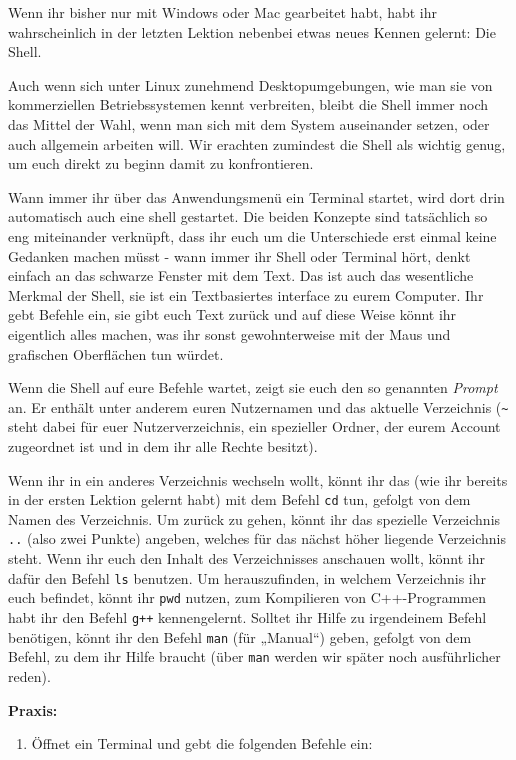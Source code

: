 
Wenn ihr bisher nur mit Windows oder Mac gearbeitet habt, habt ihr
wahrscheinlich in der letzten Lektion nebenbei etwas neues Kennen gelernt: Die
Shell.

Auch wenn sich unter Linux zunehmend Desktopumgebungen, wie man sie von
kommerziellen Betriebssystemen kennt verbreiten, bleibt die Shell immer noch das
Mittel der Wahl, wenn man sich mit dem System auseinander setzen, oder auch
allgemein arbeiten will. Wir erachten zumindest die Shell als wichtig genug, um
euch direkt zu beginn damit zu konfrontieren.

Wann immer ihr über das Anwendungsmenü ein Terminal startet, wird dort drin
automatisch auch eine shell gestartet. Die beiden Konzepte sind tatsächlich so
eng miteinander verknüpft, dass ihr euch um die Unterschiede erst einmal keine
Gedanken machen müsst - wann immer ihr Shell oder Terminal hört, denkt einfach
an das schwarze Fenster mit dem Text. Das ist auch das wesentliche Merkmal der
Shell, sie ist ein Textbasiertes interface zu eurem Computer. Ihr gebt Befehle
ein, sie gibt euch Text zurück und auf diese Weise könnt ihr eigentlich alles
machen, was ihr sonst gewohnterweise mit der Maus und grafischen Oberflächen
tun würdet.

Wenn die Shell auf eure Befehle wartet, zeigt sie euch den so genannten
\emph{Prompt} an. Er enthält unter anderem euren Nutzernamen und das aktuelle
Verzeichnis (\verb|~| steht dabei für euer Nutzerverzeichnis, ein spezieller
Ordner, der eurem Account zugeordnet ist und in dem ihr alle Rechte besitzt).

Wenn ihr in ein anderes Verzeichnis wechseln wollt, könnt ihr das (wie ihr
bereits in der ersten Lektion gelernt habt) mit dem Befehl \texttt{cd} tun,
gefolgt von dem Namen des Verzeichnis. Um zurück zu gehen, könnt ihr das
spezielle Verzeichnis \texttt{..} (also zwei Punkte) angeben, welches für das
nächst höher liegende Verzeichnis steht. Wenn ihr euch den Inhalt des
Verzeichnisses anschauen wollt, könnt ihr dafür den Befehl \texttt{ls}
benutzen. Um herauszufinden, in welchem Verzeichnis ihr euch befindet, könnt
ihr \texttt{pwd} nutzen, zum Kompilieren von C++-Programmen habt ihr den Befehl
\texttt{g++} kennengelernt. Solltet ihr Hilfe zu irgendeinem Befehl benötigen,
könnt ihr den Befehl \texttt{man} (für „Manual“) geben, gefolgt von dem Befehl,
zu dem ihr Hilfe braucht (über \texttt{man} werden wir später noch
ausführlicher reden).

\textbf{Praxis:}
\begin{enumerate}
    \item Öffnet ein Terminal und gebt die folgenden Befehle ein:
\end{enumerate}

